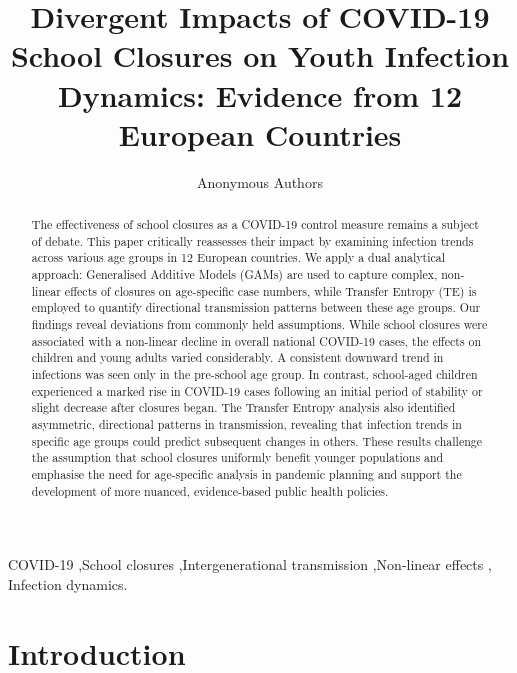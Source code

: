 \documentclass[
  number]{elsarticle}
\begin{document}
\begin{frontmatter}
\title{Divergent Impacts of COVID-19 School Closures on Youth Infection
Dynamics: Evidence from 12 European Countries}
\author[]{Anonymous Authors%
%
}




        
\begin{abstract}
The effectiveness of school closures as a COVID-19 control measure
remains a subject of debate. This paper critically reassesses their
impact by examining infection trends across various age groups in 12
European countries. We apply a dual analytical approach: Generalised
Additive Models (GAMs) are used to capture complex, non-linear effects
of closures on age-specific case numbers, while Transfer Entropy (TE) is
employed to quantify directional transmission patterns between these age
groups. Our findings reveal deviations from commonly held assumptions.
While school closures were associated with a non-linear decline in
overall national COVID-19 cases, the effects on children and young
adults varied considerably. A consistent downward trend in infections
was seen only in the pre-school age group. In contrast, school-aged
children experienced a marked rise in COVID-19 cases following an
initial period of stability or slight decrease after closures began. The
Transfer Entropy analysis also identified asymmetric, directional
patterns in transmission, revealing that infection trends in specific
age groups could predict subsequent changes in others. These results
challenge the assumption that school closures uniformly benefit younger
populations and emphasise the need for age-specific analysis in pandemic
planning and support the development of more nuanced, evidence-based
public health policies.
\end{abstract}





\begin{keyword}
    COVID-19 \sep School closures \sep Intergenerational
transmission \sep Non-linear effects \sep 
    Infection dynamics.
\end{keyword}
\end{frontmatter}
    

\section{Introduction}\label{introduction}
\end{document}
